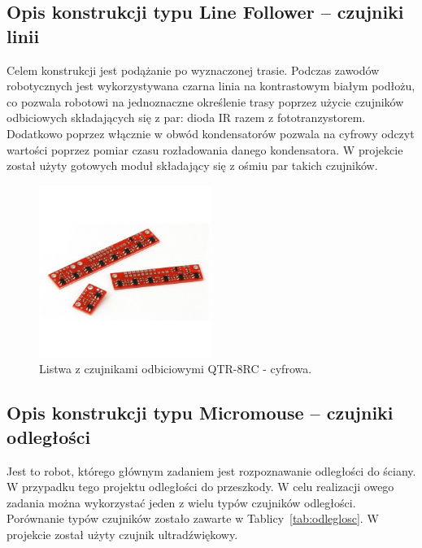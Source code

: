 \subsection{Opis konstrukcji typu Line Follower -- czujniki linii}
Celem konstrukcji jest podążanie po wyznaczonej trasie. Podczas zawodów robotycznych jest wykorzystywana czarna linia na kontrastowym białym podłożu, co pozwala robotowi na jednoznaczne określenie trasy poprzez użycie czujników odbiciowych składających się z par: dioda  IR razem z fototranzystorem. Dodatkowo poprzez włącznie w obwód kondensatorów pozwala na cyfrowy odczyt wartości poprzez pomiar czasu rozładowania danego kondensatora. W projekcie został użyty gotowych moduł składający się z ośmiu par takich czujników.
\begin{figure}[H]
\centering
\includegraphics[width=0.5\textwidth]{inzynierku/img/listwa.jpg}
\caption{\label{fig:czujnik_odbiciowy}Listwa z czujnikami odbiciowymi QTR-8RC - cyfrowa.}
\end{figure}

\subsection{Opis konstrukcji typu Micromouse -- czujniki odległości}
Jest to robot, którego głównym zadaniem jest rozpoznawanie odległości do ściany. W przypadku tego projektu odległości do przeszkody. W celu realizacji owego zadania można wykorzystać jeden z wielu typów czujników odległości. Porównanie typów czujników zostało zawarte w Tablicy~\ref{tab:odleglosc}. W projekcie został użyty czujnik ultradźwiękowy.

